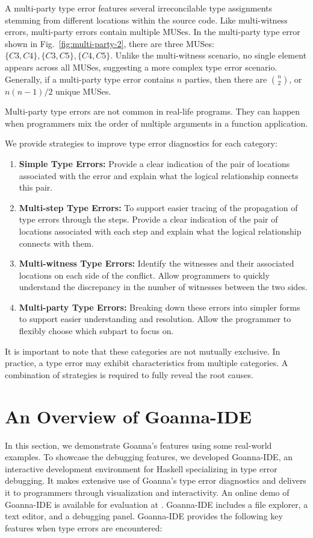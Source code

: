\documentclass[pdflatex,lineno,sn-nature,Numbered]{sn-jnl}%
\begin{document}
  A multi-party type error features several irreconcilable type assignments stemming from different locations within the source code. Like multi-witness errors, multi-party errors contain multiple MUSes. In the multi-party type error shown in Fig.~\ref{fig:multi-party-2}, there are three MUSes: $\{C3, C4\}, \{C3, C5\}, \{C4, C5\}$. Unlike the multi-witness scenario, no single element appears across all MUSes, suggesting a more complex type error scenario. Generally, if a multi-party type error contains $n$ parties, then there are $\binom{n}{2}$, or $n (n - 1) / 2$ unique MUSes.
  
Multi-party type errors are not common in real-life programs. They can happen when programmers mix the order of multiple arguments in a function application.  
  
We provide strategies to improve type error diagnostics for each category:

\begin{enumerate}
  \item {
    \textbf{Simple Type Errors:}  Provide a clear indication of the pair of locations associated with the error and explain what the logical relationship connects this pair.
  }
  
  \item {
    \textbf{Multi-step Type Errors:} To support easier tracing of the propagation of type errors through the steps. Provide a clear indication of the pair of locations associated with each step and explain what the logical relationship connects with them.
  }
  \item {
    \textbf{Multi-witness Type Errors:} Identify the witnesses and their associated locations on each side of the conflict. Allow programmers to quickly understand the discrepancy in the number of witnesses between the two sides.
  }
  \item {
    \textbf{Multi-party Type Errors:} Breaking down these errors into simpler forms to support easier understanding and resolution. Allow the programmer to flexibly choose which subpart to focus on.
  }
\end{enumerate}

It is important to note that these categories are not mutually exclusive. In practice, a type error may exhibit characteristics from multiple categories.  A combination of strategies is required to fully reveal the root causes.


\section{An Overview of Goanna-IDE} \label{sec:walkthrough}
In this section, we demonstrate Goanna's features using some real-world examples. To showcase the debugging features,  we developed Goanna-IDE, an interactive development environment for Haskell specializing in type error debugging. It makes extensive use of Goanna's type error diagnostics and delivers it to programmers through visualization and interactivity. An online demo of Goanna-IDE is available for evaluation at \cite{Fu2023-bo}. Goanna-IDE includes a file explorer, a text editor, and a debugging panel. Goanna-IDE provides the following key features when type errors are encountered:
\end{document}
